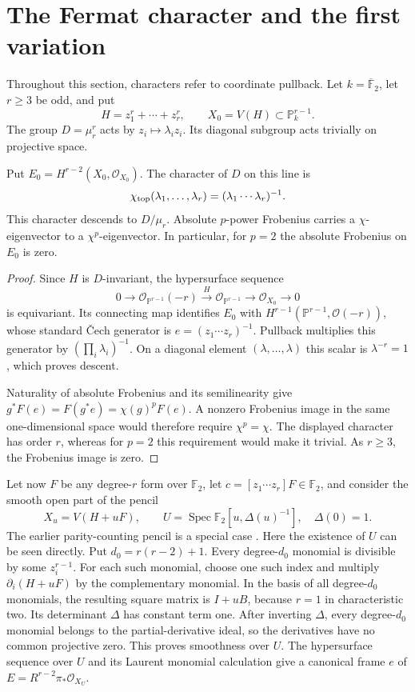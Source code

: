 \section{The Fermat character and the first variation}
\label{subsec:fermat-first-variation}

Throughout this section, characters refer to coordinate pullback.
Let $k=\overline{\mathbb F}_2$, let $r\geq3$ be odd, and put
\[
 H=z_1^r+\cdots+z_r^r,\qquad X_0=V(H)\subset\mathbb P_k^{r-1}.
\]
The group $D=\mu_r^r$ acts by $z_i\mapsto\lambda_i z_i$.
Its diagonal subgroup acts trivially on projective space.

\begin{proposition}
Put $E_0=H^{r-2}(X_0,\mathcal O_{X_0})$.
The character of $D$ on this line is
\[
 \chi_{\rm top}(\lambda_1,\ldots,\lambda_r)
       =(\lambda_1\cdots\lambda_r)^{-1}.
\]
This character descends to $D/\mu_r$.  Absolute $p$-power
Frobenius carries a $\chi$-eigenvector to a $\chi^p$-eigenvector.
In particular, for $p=2$ the absolute Frobenius on $E_0$ is zero.
\end{proposition}
\begin{proof}
Since $H$ is $D$-invariant, the hypersurface sequence
\[
 0\longrightarrow\mathcal O_{\mathbb P^{r-1}}(-r)
   \xrightarrow{\ H\ }\mathcal O_{\mathbb P^{r-1}}
   \longrightarrow\mathcal O_{X_0}\longrightarrow0
\]
is equivariant.  Its connecting map identifies $E_0$ with
$H^{r-1}(\mathbb P^{r-1},\mathcal O(-r))$, whose standard
\v Cech generator is $e=(z_1\cdots z_r)^{-1}$.
Pullback multiplies this generator by $(\prod_i\lambda_i)^{-1}$.
On a diagonal element $(\lambda,\ldots,\lambda)$ this scalar is
$\lambda^{-r}=1$, which proves descent.

Naturality of absolute Frobenius and its semilinearity give
$g^*F(e)=F(g^*e)=\chi(g)^pF(e)$.  A nonzero Frobenius image
in the same one-dimensional space would therefore require
$\chi^p=\chi$.  The displayed character has order $r$, whereas
for $p=2$ this requirement would make it trivial.  As $r\geq3$,
the Frobenius image is zero.
\end{proof}

Let now $F$ be any degree-$r$ form over $\mathbb F_2$, let
$c=[z_1\cdots z_r]F\in\mathbb F_2$, and consider the smooth open
part of the pencil
\[
 X_u=V(H+uF),\qquad
 U=\operatorname{Spec}\mathbb F_2[u,\Delta(u)^{-1}],\quad
 \Delta(0)=1.
\]
The earlier parity-counting pencil is a special case \citep{ParityCompanion}.
Here the existence of $U$ can be seen directly. Put $d_0=r(r-2)+1$.
Every degree-$d_0$ monomial is divisible by some $z_i^{r-1}$.
For each such monomial, choose one such index and multiply
$\partial_i(H+uF)$ by the complementary monomial. In the basis of
all degree-$d_0$ monomials, the resulting square matrix is $I+uB$,
because $r=1$ in characteristic two. Its determinant $\Delta$ has
constant term one. After inverting $\Delta$, every degree-$d_0$
monomial belongs to the partial-derivative ideal, so the derivatives
have no common projective zero. This proves smoothness over $U$.
The hypersurface sequence over $U$ and its Laurent monomial
calculation give a canonical frame $e$ of
$E=R^{r-2}\pi_*\mathcal O_{X_U}$.

